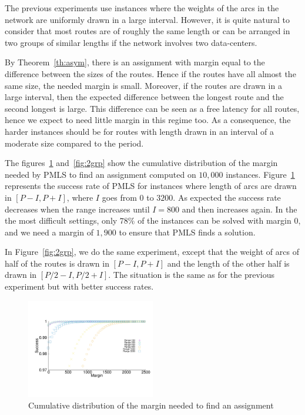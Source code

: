 \documentclass[10pt, conference, letterpaper]{IEEEtran}
\begin{document}
     The previous experiments use instances where the weights of the arcs in the network are uniformly drawn in a large interval. However, it is quite natural to consider that most routes are of roughly the same length or can be arranged in two groups of similar lengths if the network involves two data-centers.
     
     By Theorem~\ref{th:asym}, there is an assignment with margin equal to the difference
     between the sizes of the routes. Hence if the routes have all almost the same size, the needed margin is small. Moreover, if the routes are drawn in a large interval, then the expected difference between the longest route and the second longest is large. This difference can be seen as a free latency for all routes, hence we expect to need little margin in this regime too. As a consequence, the harder instances should be for routes with length 
     drawn in an interval of a moderate size compared to the period.
     
     The figures~\ref{fig:1grp} and~\ref{fig:2grp} show the cumulative distribution of the margin needed by PMLS to find an assignment computed on $10,000$ instances.
     Figure~\ref{fig:1grp} represents the success rate of PMLS for instances where length of arcs are drawn in $[P-I,P+I]$, where $I$ goes from $0$ to $3200$. As expected the success rate decreases when the range increases until $I = 800$ and then increases again.  In the the most difficult settings, only $78\%$ of the instances can be solved with margin $0$, and we need a margin of $1,900$ to ensure that PMLS finds a solution.
    
     In Figure~\ref{fig:2grp}, we do the same experiment, except that the weight of arcs of half of the routes is drawn in $[P-I,P+I]$ and the length of the other half is drawn in $[P/2-I,P/2 + I]$. The situation is the same as for the previous experiment but with better success rates. 

          
              \begin{figure}
       \begin{center}
      \includegraphics[width = 0.5\textwidth]{departs_distrib1Grp.pdf}
      \end{center}
      \caption{Cumulative distribution of the margin needed to find an assignment}
      \label{fig:1grp}   
     \end{figure}    
     
\end{document}
